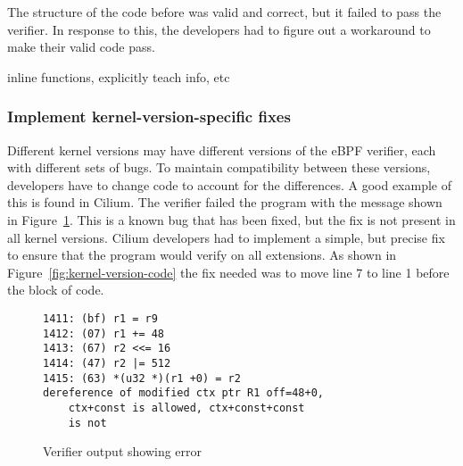 {{{{{{The structure of the code before was valid and correct, but it failed to pass the verifier.
In response to this, the developers had to figure out a workaround to make their valid code pass.


inline functions, explicitly teach info, etc

\subsubsection{Implement kernel-version-specific fixes}
Different kernel versions may have different versions of the eBPF verifier, each with different sets of bugs.
To maintain compatibility between these versions, developers have to change code to account for the differences.
A good example of this is found in Cilium.
The verifier failed the program with the message shown in Figure~\ref{fig:kernel-version}.
This is a known bug that has been fixed, but the fix is not present in all kernel versions.
Cilium developers had to implement a simple, but precise fix to ensure that the program would verify on all extensions.
As shown in Figure~\ref{fig:kernel-version-code} the fix needed was to move line 7 to line 1 before the block of code.

\begin{figure}
    \begin{lstlisting}[language=myC]
1411: (bf) r1 = r9
1412: (07) r1 += 48
1413: (67) r2 <<= 16
1414: (47) r2 |= 512
1415: (63) *(u32 *)(r1 +0) = r2
dereference of modified ctx ptr R1 off=48+0, 
    ctx+const is allowed, ctx+const+const 
    is not
    \end{lstlisting}
    \caption{Verifier output showing error}
    \label{fig:kernel-version}
\end{figure}

}}}}}}
